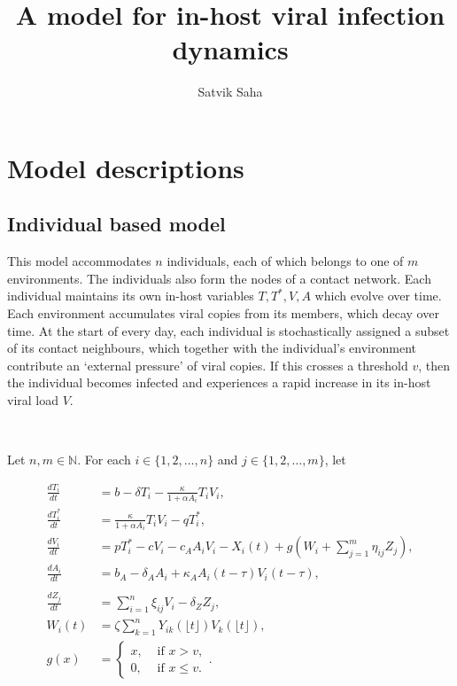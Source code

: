 \documentclass[11pt]{article}
\title{A model for in-host viral infection dynamics}
\author{Satvik Saha}
\date{}
\begin{document}
    \maketitle

    \section{Model descriptions}

    \subsection{Individual based model}

    This model accommodates $n$ individuals, each of which belongs to one of
    $m$ environments. The individuals also form the nodes of a contact
    network. Each individual maintains its own in-host variables $T, T^*, V,
    A$ which evolve over time. Each environment accumulates viral copies from
    its members, which decay over time. At the start of every day, each
    individual is stochastically assigned a subset of its contact neighbours,
    which together with the individual's environment contribute an `external
    pressure' of viral copies. If this crosses a threshold $v$, then the
    individual becomes infected and experiences a rapid increase in its
    in-host viral load $V$.

    ~

    Let $n, m \in \mathbb{N}$. For each $i \in \{1, 2, \dots, n\}$ and $j \in
    \{1, 2, \dots, m\}$, let

    \begin{align}
        \frac{dT_i}{dt} &= b -  \delta T_i - \frac{\kappa}{1 + \alpha A_i} T_iV_i, \\
        \frac{dT^*_i}{dt} &= \frac{\kappa}{1 + \alpha A_i} T_iV_i - qT^*_i, \\
        \frac{dV_i}{dt} &= pT^*_i - cV_i - c_A A_iV_i - X_i(t) + g\left(W_i + \sum_{j = 1}^m \eta_{ij} Z_j\right), \\
        \frac{dA_i}{dt} &= b_A -  \delta_A A_i + \kappa_A A_i(t - \tau)V_i(t - \tau), \\\\
        \frac{dZ_j}{dt} &= \sum_{i = 1}^n \xi_{ij} V_i - \delta_Z Z_j, \\
        W_i(t) &= \zeta \sum_{k = 1}^n Y_{ik}(\lfloor t\rfloor) V_k(\lfloor t\rfloor), \\
        g(x) &= \begin{cases}
            x, &\text{ if } x > v, \\
            0, &\text{ if } x \leq v.
        \end{cases}.
    \end{align}
\end{document}
